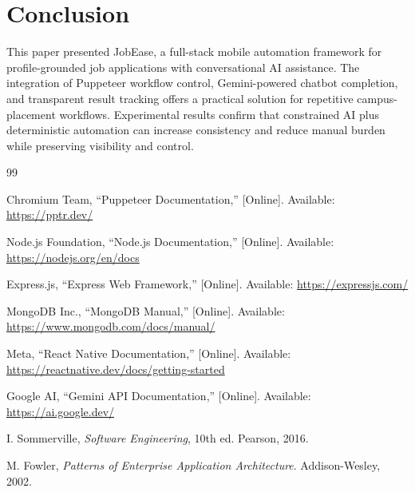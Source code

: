 \documentclass[conference]{IEEEtran}
\begin{document}
\section{Conclusion}
This paper presented JobEase, a full-stack mobile automation framework for profile-grounded job applications with conversational AI assistance. The integration of Puppeteer workflow control, Gemini-powered chatbot completion, and transparent result tracking offers a practical solution for repetitive campus-placement workflows. Experimental results confirm that constrained AI plus deterministic automation can increase consistency and reduce manual burden while preserving visibility and control.

\begin{thebibliography}{99}

Chromium Team, ``Puppeteer Documentation,'' [Online]. Available: \url{https://pptr.dev/}

Node.js Foundation, ``Node.js Documentation,'' [Online]. Available: \url{https://nodejs.org/en/docs}

Express.js, ``Express Web Framework,'' [Online]. Available: \url{https://expressjs.com/}

MongoDB Inc., ``MongoDB Manual,'' [Online]. Available: \url{https://www.mongodb.com/docs/manual/}

Meta, ``React Native Documentation,'' [Online]. Available: \url{https://reactnative.dev/docs/getting-started}

Google AI, ``Gemini API Documentation,'' [Online]. Available: \url{https://ai.google.dev/}

I. Sommerville, \textit{Software Engineering}, 10th ed. Pearson, 2016.

M. Fowler, \textit{Patterns of Enterprise Application Architecture}. Addison-Wesley, 2002.

\end{thebibliography}
\end{document}
